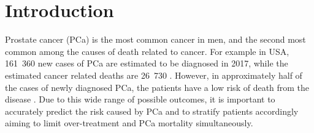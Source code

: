 \documentclass[10pt,letterpaper]{article}
\newcommand{\citep}{\cite}
\begin{document}
%
%
%
%
%

%
\newpage
\section{Introduction}

Prostate cancer (PCa) is the most common cancer in men, and the second most
common among the causes of death related to cancer. For example in USA, 161~360
new cases of PCa are estimated to be diagnosed in 2017, while the estimated
cancer related deaths are 26~730 \citep{Siegel2017}. However, in approximately
half of the cases of newly diagnosed PCa, the patients have a low risk of death
from the disease \citep{Walsh2007, Draisma2003}. Due to this wide range of
possible outcomes, it is important to accurately predict the risk caused by
PCa and to stratify patients accordingly aiming to limit over-treatment and
PCa mortality simultaneously.
\end{document}

